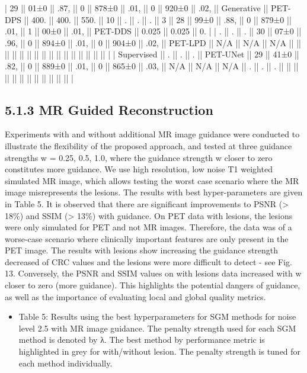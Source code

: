 \documentclass{article}
\begin{document}
| 29          || 01±0  || .87,   || 0         || 878±0    || .01,  || 0    || 920±0 || .02,  || Generative || PET-DPS || 400.  || 400.       || 550.        || 10   || .    || .     || .         || 3   || 28   || 99±0 || .88, || 0     || 879±0 || .01, || 1     || 00±0 || .01,        || PET-DDS || 0.025 || 0.025 || 0.  |
| .           || .     || .      || 30        || 07±0     || .96,  || 0    || 894±0 || .01,  || 0          || 904±0   || .02,  || PET-LPD    || N/A         || N/A  || N/A  ||       ||           ||     ||      ||      ||      ||       ||       ||      ||       ||      ||             ||         ||       ||       ||     |
| Supervised  || .     || .      || .         || PET-UNet || 29    || 41±0 || .82,  || 0     || 889±0      || .01,    || 0     || 865±0      || .03,        || N/A  || N/A  || N/A   || .         || .   || .    ||      ||      ||       ||       ||      ||       ||      ||             ||         ||       ||       ||     |

\subsection{5.1.3 MR Guided Reconstruction}

Experiments with and without additional MR image guidance were conducted to illustrate the flexibility of the proposed approach, and tested at three guidance strengths w = 0.25, 0.5, 1.0, where the guidance strength w closer to zero constitutes more guidance. We use high resolution, low noise T1 weighted simulated MR image, which allows testing the worst case scenario where the MR image misrepresents the lesions. The results with best hyper-parameters are given in Table 5. It is observed that there are significant improvements to PSNR (> 18\%) and SSIM (> 13\%) with guidance. On PET data with lesions, the lesions were only simulated for PET and not MR images. Therefore, the data was of a worse-case scenario where clinically important features are only present in the PET image. The results with lesions show increasing the guidance strength decreased of CRC values and the lesions were more difficult to detect - see Fig. 13. Conversely, the PSNR and SSIM values on with lesions data increased with w closer to zero (more guidance). This highlights the potential dangers of guidance, as well as the importance of evaluating local and global quality metrics.
\begin{itemize}
\item 
Table 5: Results using the best hyperparameters for SGM methods for noise level 2.5 with MR image guidance. The penalty strength used for each SGM method is denoted by λ. The best method by performance metric is highlighted in grey for with/without lesion. The penalty strength is tuned for each method individually.

\end{itemize}
\end{document}
